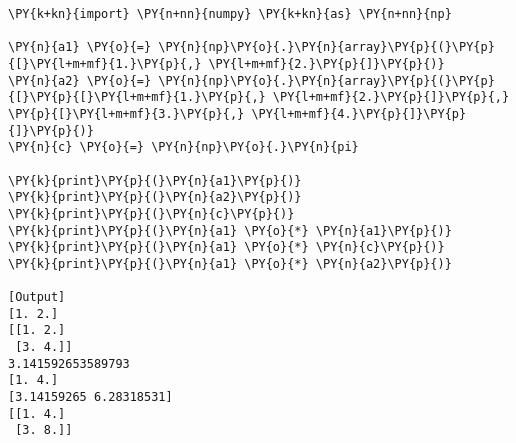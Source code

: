 \begin{Verbatim}[label=\makebox{\url{https://github.com/lucabaldini/cmepda/tree/master/slides/latex/snippets/numpy\_arrays\_broadcasting.py}},commandchars=\\\{\}]
\PY{k+kn}{import} \PY{n+nn}{numpy} \PY{k+kn}{as} \PY{n+nn}{np}

\PY{n}{a1} \PY{o}{=} \PY{n}{np}\PY{o}{.}\PY{n}{array}\PY{p}{(}\PY{p}{[}\PY{l+m+mf}{1.}\PY{p}{,} \PY{l+m+mf}{2.}\PY{p}{]}\PY{p}{)}
\PY{n}{a2} \PY{o}{=} \PY{n}{np}\PY{o}{.}\PY{n}{array}\PY{p}{(}\PY{p}{[}\PY{p}{[}\PY{l+m+mf}{1.}\PY{p}{,} \PY{l+m+mf}{2.}\PY{p}{]}\PY{p}{,} \PY{p}{[}\PY{l+m+mf}{3.}\PY{p}{,} \PY{l+m+mf}{4.}\PY{p}{]}\PY{p}{]}\PY{p}{)}
\PY{n}{c} \PY{o}{=} \PY{n}{np}\PY{o}{.}\PY{n}{pi}

\PY{k}{print}\PY{p}{(}\PY{n}{a1}\PY{p}{)}
\PY{k}{print}\PY{p}{(}\PY{n}{a2}\PY{p}{)}
\PY{k}{print}\PY{p}{(}\PY{n}{c}\PY{p}{)}
\PY{k}{print}\PY{p}{(}\PY{n}{a1} \PY{o}{*} \PY{n}{a1}\PY{p}{)}
\PY{k}{print}\PY{p}{(}\PY{n}{a1} \PY{o}{*} \PY{n}{c}\PY{p}{)}
\PY{k}{print}\PY{p}{(}\PY{n}{a1} \PY{o}{*} \PY{n}{a2}\PY{p}{)}

[Output]
[1. 2.]
[[1. 2.]
 [3. 4.]]
3.141592653589793
[1. 4.]
[3.14159265 6.28318531]
[[1. 4.]
 [3. 8.]]
\end{Verbatim}